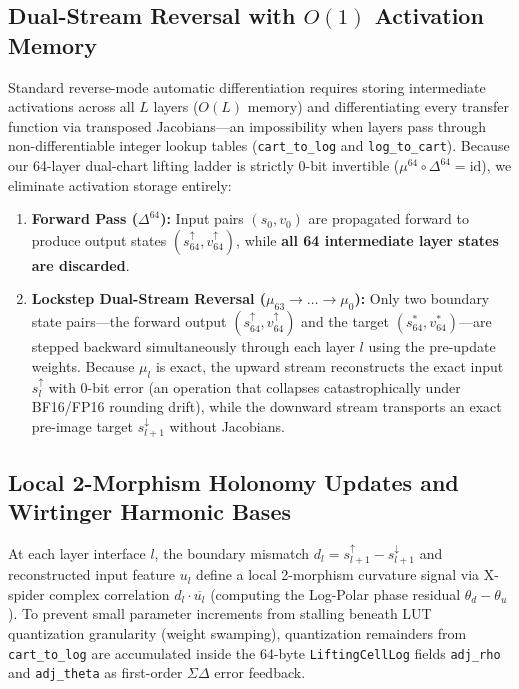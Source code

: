 \documentclass[11pt, a4paper]{article}
\begin{document}
\subsection{Dual-Stream Reversal with $O(1)$ Activation Memory}
Standard reverse-mode automatic differentiation requires storing intermediate activations across all $L$ layers ($O(L)$ memory) and differentiating every transfer function via transposed Jacobians---an impossibility when layers pass through non-differentiable integer lookup tables (\texttt{cart\_to\_log} and \texttt{log\_to\_cart}). Because our 64-layer dual-chart lifting ladder is strictly 0-bit invertible ($\mu^{64} \circ \Delta^{64} = \mathrm{id}$), we eliminate activation storage entirely:
\begin{enumerate}
    \item \textbf{Forward Pass ($\Delta^{64}$):} Input pairs $(s_0, v_0)$ are propagated forward to produce output states $(s_{64}^{\uparrow}, v_{64}^{\uparrow})$, while \textbf{all 64 intermediate layer states are discarded}.
    \item \textbf{Lockstep Dual-Stream Reversal ($\mu_{63} \to \dots \to \mu_0$):} Only two boundary state pairs---the forward output $(s_{64}^{\uparrow}, v_{64}^{\uparrow})$ and the target $(s_{64}^*, v_{64}^*)$---are stepped backward simultaneously through each layer $l$ using the pre-update weights. Because $\mu_l$ is exact, the upward stream reconstructs the exact input $s_l^{\uparrow}$ with 0-bit error (an operation that collapses catastrophically under BF16/FP16 rounding drift), while the downward stream transports an exact pre-image target $s_{l+1}^{\downarrow}$ without Jacobians.
\end{enumerate}

\subsection{Local 2-Morphism Holonomy Updates and Wirtinger Harmonic Bases}
At each layer interface $l$, the boundary mismatch $d_l = s_{l+1}^{\uparrow} - s_{l+1}^{\downarrow}$ and reconstructed input feature $u_l$ define a local 2-morphism curvature signal via X-spider complex correlation $d_l \cdot \overline{u_l}$ (computing the Log-Polar phase residual $\theta_d - \theta_u$). To prevent small parameter increments from stalling beneath LUT quantization granularity (weight swamping), quantization remainders from \texttt{cart\_to\_log} are accumulated inside the 64-byte \texttt{LiftingCellLog} fields \texttt{adj\_rho} and \texttt{adj\_theta} as first-order $\Sigma\Delta$ error feedback.
\end{document}
